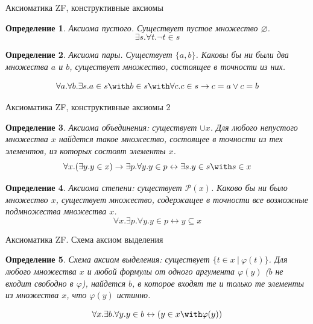\documentclass[aspectratio=169]{beamer}
\newtheorem{dfn}{Определение}[section]
\begin{document}
\begin{frame}{Аксиоматика ZF, конструктивные аксиомы}
\begin{dfn} Аксиома пустого. Существует пустое множество $\varnothing$. $$\exists s.\forall t.\neg t \in s$$ \end{dfn}\pause
\begin{dfn} Аксиома пары. Существует $\{a,b\}$.
Каковы бы ни были два множества $a$ и $b$, существует множество, состоящее 
в точности из них. 

$$\forall a.\forall b.\exists s.a \in s \with b \in s \with \forall c.c \in s \rightarrow c = a \vee c = b$$ \end{dfn}
\end{frame}

\begin{frame}{Аксиоматика ZF, конструктивные аксиомы 2}
\begin{dfn} Аксиома объединения: существует $\cup x$. 
Для любого непустого множества $x$ найдется такое множество, состоящее в точности
из тех элементов, из которых состоят элементы $x$. 
$$\forall x.(\exists y.y \in x) \rightarrow \exists p.\forall y.y \in p \leftrightarrow \exists s.y \in s \with s \in x$$
 \end{dfn}\pause
\begin{dfn} Аксиома степени: существует $\mathcal{P}(x)$.
Каково бы ни было множество $x$, существует множество, содержащее в точности
все возможные подмножества множества $x$.
$$\forall x.\exists p.\forall y.y \in p \leftrightarrow y \subseteq x$$
\end{dfn}
\end{frame}

\begin{frame}{Аксиоматика ZF. Схема аксиом выделения}
\begin{dfn} Схема аксиом выделения: существует $\{ t \in x\ |\ \varphi(t)\}$.
Для любого множества $x$ и любой формулы от одного аргумента $\varphi(y)$
($b$ не входит свободно в $\varphi$), найдется $b$, в которое
входят те и только те элементы из множества $x$, что $\varphi(y)$ истинно.

$$\forall x.\exists b.\forall y.y \in b \leftrightarrow (y \in x \with \varphi(y))$$
\end{dfn}
\end{frame}
\end{document}
